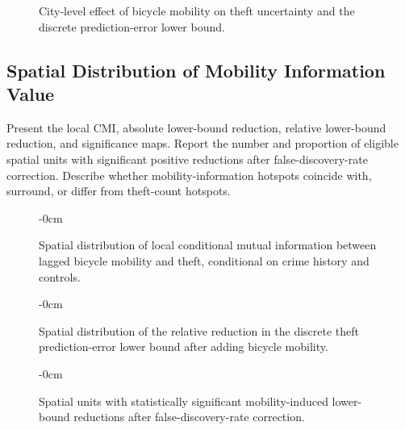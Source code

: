 \documentclass[applsci,article,submit,moreauthors]{Definitions/mdpi}
\begin{document}
\begin{figure}[H]
\centering
{}
\caption{City-level effect of bicycle mobility on theft uncertainty and the discrete prediction-error lower bound.}
\label{fig:city_entropy_bound}
\end{figure}

\subsection{Spatial Distribution of Mobility Information Value}
\label{subsec:results_local_maps}

Present the local CMI, absolute lower-bound reduction, relative lower-bound reduction, and significance maps. Report the number and proportion of eligible spatial units with significant positive reductions after false-discovery-rate correction. Describe whether mobility-information hotspots coincide with, surround, or differ from theft-count hotspots.

\begin{figure}[H]
\begin{adjustwidth}{-\extralength}{0cm}
\centering
{}
\end{adjustwidth}
\caption{Spatial distribution of local conditional mutual information between lagged bicycle mobility and theft, conditional on crime history and controls.}
\label{fig:local_cmi_maps}
\end{figure}

\begin{figure}[H]
\begin{adjustwidth}{-\extralength}{0cm}
\centering
{}
\end{adjustwidth}
\caption{Spatial distribution of the relative reduction in the discrete theft prediction-error lower bound after adding bicycle mobility.}
\label{fig:local_bound_maps}
\end{figure}

\begin{figure}[H]
\begin{adjustwidth}{-\extralength}{0cm}
\centering
{}
\end{adjustwidth}
\caption{Spatial units with statistically significant mobility-induced lower-bound reductions after false-discovery-rate correction.}
\label{fig:significant_bound_maps}
\end{figure}
\end{document}

